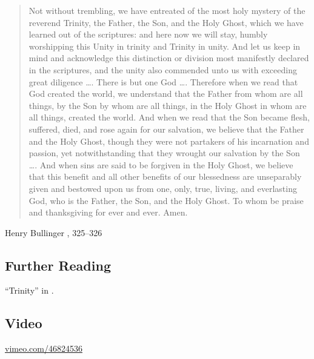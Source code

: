 \documentclass[00-main.tex]{subfiles}
\begin{document}
\begin{quotation}
Not without trembling, we have entreated of the most holy mystery of the reverend Trinity, the Father, the Son, and the Holy Ghost, which we have learned out of the scriptures: and here now we will stay, humbly worshipping this Unity in trinity and Trinity in unity. And let us keep in mind and acknowledge this distinction or division most manifestly declared in the scriptures, and the unity also commended unto us with exceeding great diligence \ldots. There is but one God \ldots. Therefore when we read that God created the world, we understand that the Father from whom are all things, by the Son by whom are all things, in the Holy Ghost in whom are all things, created the world. And when we read that the Son became flesh, suffered, died, and rose again for our salvation, we believe that the Father and the Holy Ghost, though they were not partakers of his incarnation and passion, yet notwithstanding that they wrought our salvation by the Son \ldots. And when sins are said to be forgiven in the Holy Ghost, we believe that this benefit and all other benefits of our blessedness are unseparably given and bestowed upon us from one, only, true, living, and everlasting God, who is the Father, the Son, and the Holy Ghost. To whom be praise and thanksgiving for ever and ever. Amen.
\end{quotation}

\begin{flushright}
	Henry Bullinger \cite{Bullinger:1851}, 325--326
\end{flushright}






\begin{paracol}{2}
	\subsection{Further Reading}
	
	``Trinity'' in \cite{Packer:2001}.
	
	\switchcolumn 
	
	\subsection{Video}
	\href{https://vimeo.com/46824536}{vimeo.com\slash{}46824536}
\end{paracol}
\end{document}
